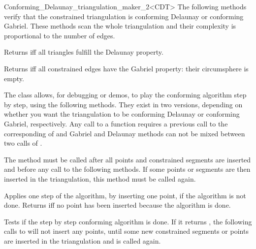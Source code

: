 \begin{ccRefClass}{Conforming_Delaunay_triangulation_maker_2<CDT>}
The following methods verify that the constrained triangulation is
conforming Delaunay or conforming Gabriel. These methods scan the
whole triangulation and their complexity is proportional to the number
of edges.

{ Returns  iff all triangles fulfill the Delaunay property.}

{ Returns  iff all constrained edges have the Gabriel property:
  their circumsphere is empty. }

\begin{ccAdvanced}


The \ccRefName{} class allows, for debugging or demos, to play the
conforming algorithm step by step, using the following methods. They
exist in two versions, depending on whether you want the triangulation to
be conforming Delaunay or conforming Gabriel, respectively. Any call to a
 function requires a previous call to
the corresponding of  and Gabriel and Delaunay methods can not
be mixed between two calls of .

{ The method must be called after all points and constrained segments
  are inserted and before any call to the following methods. If some
  points or segments are then inserted in the triangulation, this
  method must be called again. }

{ Applies one step of the algorithm, by inserting one point, if the
  algorithm is not done. Returns  iff no point has been inserted
  because the algorithm is done. }



{ Tests if the step by step conforming algorithm is done. If it
  returns , the following calls to
   will not insert any points, until some
  new constrained segments or points are inserted in the triangulation and
   is called again. }

\end{ccAdvanced}

\end{ccRefClass}

